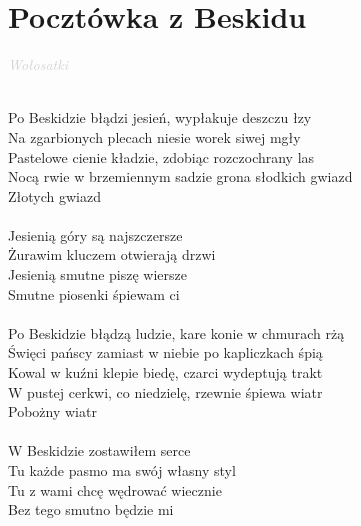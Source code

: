 \documentclass[a5paper, 10pt]{book}
\begin{document}
\section{Pocztówka z Beskidu}\textcolor{lightgray}{\textit{Wołosatki}}\\~\\
\begin{minipage}[t]{0.8\textwidth}
Po Beskidzie błądzi jesień, wypłakuje deszczu łzy\\
Na zgarbionych plecach niesie worek siwej mgły\\
Pastelowe cienie kładzie, zdobiąc rozczochrany las\\
Nocą rwie w brzemiennym sadzie grona słodkich gwiazd\\
Złotych gwiazd\\
\\
\hspace*{5mm}Jesienią góry są najszczersze\\
\hspace*{5mm}Żurawim kluczem otwierają drzwi\\
\hspace*{5mm}Jesienią smutne piszę wiersze\\
\hspace*{5mm}Smutne piosenki śpiewam ci\\
\\
Po Beskidzie błądzą ludzie, kare konie w chmurach rżą\\
Święci pańscy zamiast w niebie po kapliczkach śpią\\
Kowal w kuźni klepie biedę, czarci wydeptują trakt\\
W pustej cerkwi, co niedzielę, rzewnie śpiewa wiatr\\
Pobożny wiatr\\
\\
\hspace*{5mm}W Beskidzie zostawiłem serce\\
\hspace*{5mm}Tu każde pasmo ma swój własny styl\\
\hspace*{5mm}Tu z wami chcę wędrować wiecznie\\
\hspace*{5mm}Bez tego smutno będzie mi\\
\end{minipage}
\end{document}
